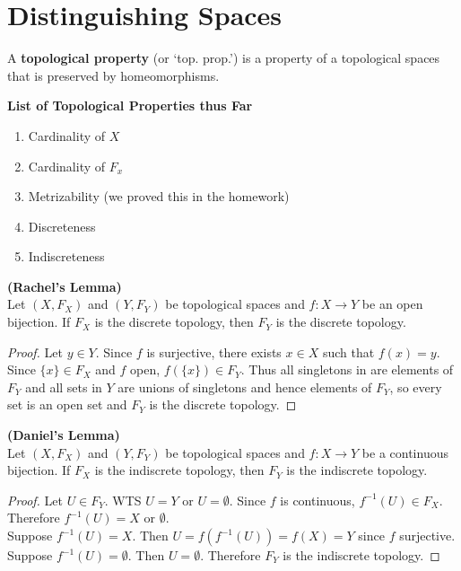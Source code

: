 \chapter{Distinguishing Spaces}
\begin{definition}
A {\bf topological property} (or `top. prop.') is a property of a topological spaces that is preserved by homeomorphisms. 
\end{definition}
\begin{center} {\bf List of Topological Properties thus Far} \end{center}
\begin{enumerate}
\item Cardinality of $X$ 
\item Cardinality of $F_x$
\item Metrizability (we proved this in the homework)
\item Discreteness 
\item Indiscreteness
\end{enumerate}

\begin{lemma} {\bf (Rachel's Lemma)}\\
Let $(X, F_X) $ and $(Y, F_Y)$ be topological spaces and $f: X \rightarrow Y$ be  an open bijection. If $F_X$ is the discrete topology, then $F_Y$ is the discrete topology.
\end{lemma}
\begin{proof}
Let $y \in Y$. Since $f$ is surjective, there exists $x \in X$ such that $f(x) = y$. Since $\{x\} \in F_X$ and $f$ open, $f(\{x\}) \in F_Y$. Thus all singletons in are elements of $F_Y$ and all sets in $Y$ are unions of singletons and hence elements of $F_Y$, so every set is an open set and $F_Y$ is the discrete topology. 
\end{proof}

\begin{lemma} {\bf (Daniel's Lemma)}\\
Let $(X, F_X) $ and $(Y, F_Y)$ be topological spaces and $f: X \rightarrow Y$ be  a continuous bijection. If $F_X$ is the indiscrete topology, then $F_Y$ is the indiscrete topology.
\end{lemma}
\begin{proof}
Let $U \in F_Y$. WTS $U = Y$ or $U = \emptyset$. Since $f$ is continuous, $f^{-1}(U) \in F_X$. Therefore $f^{-1}(U) = X$ or $\emptyset$. \\
Suppose $f^{-1}(U) = X$. Then $U = f(f^{-1}(U)) = f(X) = Y$ since $f$ surjective.\\
Suppose $f^{-1}(U) = \emptyset$. Then $U = \emptyset$. Therefore $F_Y$ is the indiscrete topology. 
\end{proof}

